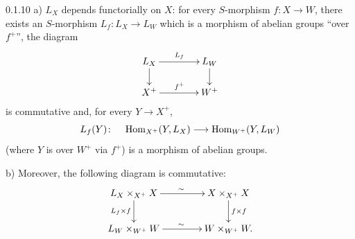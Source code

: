 \begin{corollary}{0.1.10}
\label{III.0.1.10}
{\renewcommand{\thefootnote}{(16)}}%
a) \(L_{X}\) depends functorially on \(X\): for every
\(S\)-morphism \(f\colon X\to W\), there exists an \(S\)-morphism
\(L_{f}\colon L_{X}\to L_{W}\) which is a morphism
of abelian groups ``over \(f^{+}\)'', \ie the diagram
\[
\xymatrix@C=4em@R=1.8em{
L_{X} \ar[r]^{L_{f}} \ar[d]
& L_{W} \ar[d]
\\
X^{+} \ar[r]^{f^{+}}
& W^{+}
}
\]
is commutative and, for every \(Y\to X^{+}\),
\[
L_{f}(Y)\colon
\quad\operatorname{Hom}_{X^{+}}(Y,L_{X})\longrightarrow\operatorname{Hom}_{W^{+}}(Y,L_{W})
\]
(where \(Y\) is over \(W^{+}\) via \(f^{+}\)) is a morphism of abelian groups.

b) Moreover, the following diagram is commutative:
\[
\xymatrix@C=4em@R=2.2em{
L_{X}\times_{X^{+}}X
  \ar[r]^{\sim}
  \ar[d]_{L_{f}\times f}
& X\times_{X^{+}}X
  \ar[d]^{f\times f}
\\
L_{W}\times_{W^{+}}W
  \ar[r]^{\sim}
& W\times_{W^{+}}W.
}
\]
\end{corollary}

